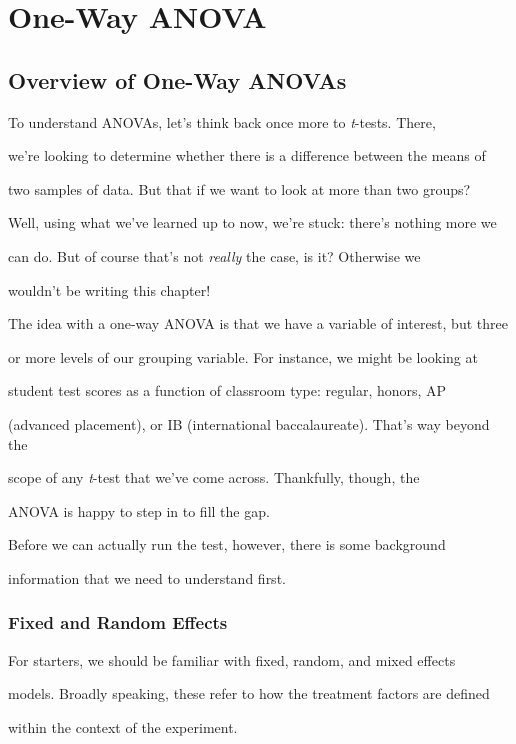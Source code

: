 
\chapter{One-Way ANOVA}

\section{Overview of One-Way ANOVAs}

To understand ANOVAs, let's think back once more to \textit{t}-tests. There, 

we're looking to determine whether there is a difference between the means of 

two samples of data. But that if we want to look at more than two groups? 

Well, using what we've learned up to now, we're stuck: there's nothing more we 

can do. But of course that's not \textit{really} the case, is it? Otherwise we 

wouldn't be writing this chapter!

The idea with a one-way ANOVA is that we have a variable of interest, but three 

or more levels of our grouping variable. For instance, we might be looking at 

student test scores as a function of classroom type: regular, honors, AP 

(advanced placement), or IB (international baccalaureate). That's way beyond the 

scope of any \textit{t}-test that we've come across. Thankfully, though, the 

ANOVA is happy to step in to fill the gap.

Before we can actually run the test, however, there is some background 

information that we need to understand first.

\subsection{Fixed and Random Effects}

For starters, we should be familiar with fixed, random, and mixed effects 

models. Broadly speaking, these refer to how the treatment factors are defined 

within the context of the experiment.

